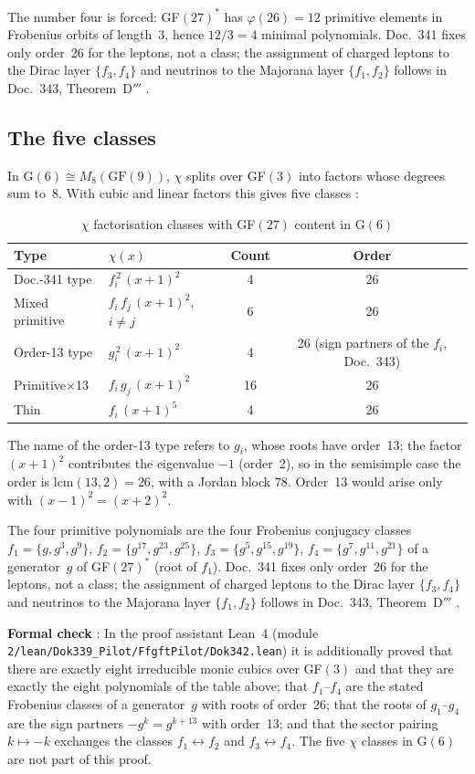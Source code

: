 The number four is forced: GF$(27)^*$ has $\varphi(26) = 12$ primitive elements
in Frobenius orbits of length~3, hence $12/3 = 4$ minimal polynomials.
Doc.~341 fixes only order~26 for the leptons, not a class; the assignment of
charged leptons to the Dirac layer $\{f_3,f_4\}$ and neutrinos to the Majorana
layer $\{f_1,f_2\}$ follows in Doc.~343, Theorem~D$'''$ \SM.

\subsection{The five classes}

In G$(6) \cong M_8(\text{GF}(9))$, $\chi$ splits over GF$(3)$ into factors whose
degrees sum to~8. With cubic and linear factors this gives five classes \BM:

\begin{table}[H]
\centering
\caption{$\chi$ factorisation classes with GF$(27)$ content in G$(6)$}
\begin{tabular}{llcc}
\toprule
Type & $\chi(x)$ & Count & Order \\
\midrule
Doc.-341 type & $f_i^{\,2}\,(x{+}1)^2$ & 4 & 26 \\
Mixed primitive & $f_i\, f_j\,(x{+}1)^2$, $i \neq j$ & 6 & 26 \\
Order-13 type & $g_i^{\,2}\,(x{+}1)^2$ & 4 & 26 (sign partners of the $f_i$, Doc.~343) \\
Primitive$\times$13 & $f_i\, g_j\,(x{+}1)^2$ & 16 & 26 \\
Thin & $f_i\,(x{+}1)^5$ & 4 & 26 \\
\bottomrule
\end{tabular}
\end{table}
\noindent The name of the order-13 type refers to $g_i$, whose roots have order~13;
the factor $(x+1)^2$ contributes the eigenvalue $-1$ (order~2), so in the semisimple case
the order is $\mathrm{lcm}(13,2)=26$, with a Jordan block $78$. Order~13 would arise only with $(x-1)^2=(x+2)^2$.

The four primitive polynomials are the four Frobenius conjugacy classes
$f_1 = \{g, g^3, g^9\}$, $f_2 = \{g^{17}, g^{23}, g^{25}\}$, $f_3 = \{g^5, g^{15}, g^{19}\}$,
$f_4 = \{g^7, g^{11}, g^{21}\}$ of a generator~$g$ of GF$(27)^*$ (root of $f_1$). Doc.~341 fixes only order~26 for the leptons, not a class;
the assignment of charged leptons to the Dirac layer $\{f_3,f_4\}$ and neutrinos
to the Majorana layer $\{f_1,f_2\}$ follows in Doc.~343, Theorem~D$'''$ \SM.

\noindent\textbf{Formal check} \LM: In the proof assistant Lean~4 (module
\texttt{2/\allowbreak lean/\allowbreak Dok339\_Pilot/\allowbreak FfgftPilot/\allowbreak Dok342.lean}) it is additionally proved
that there are exactly eight irreducible monic cubics over GF$(3)$ and that they
are exactly the eight polynomials of the table above; that $f_1$--$f_4$ are the
stated Frobenius classes of a generator~$g$ with roots of order~26; that the
roots of $g_1$--$g_4$ are the sign partners $-g^k=g^{k+13}$ with order~13; and
that the sector pairing $k\mapsto-k$ exchanges the classes
$f_1\leftrightarrow f_2$ and $f_3\leftrightarrow f_4$. The five $\chi$ classes
in G$(6)$ are not part of this proof.

